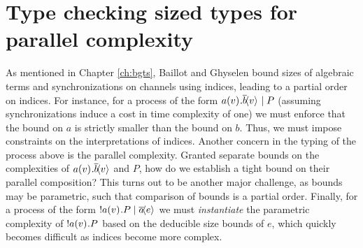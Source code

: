 \chapter{Type checking sized types for parallel complexity}\label{ch:typecheck}
As mentioned in Chapter \ref{ch:bgts}, Baillot and Ghyselen \cite{BaillotGhyselen2021} bound sizes of algebraic terms and synchronizations on channels using indices, leading to a partial order on indices. For instance, for a process of the form $a(v)^{}.\overline{b}\!\langle v\rangle^{} \mid P$ (assuming synchronizations induce a cost in time complexity of one) we must enforce that the bound on $a$ is strictly smaller than the bound on $b$. Thus, we must impose constraints on the interpretations of indices. Another concern in the typing of the process above is the parallel complexity. Granted separate bounds on the complexities of $a(v)^{}.\overline{b}\!\langle v\rangle^{}$ and $P$, how do we establish a tight bound on their parallel composition? This turns out to be another major challenge, as bounds may be parametric, such that comparison of bounds is a partial order. Finally, for a process of the form $!a(v)^{}.P \mid \overline{a}\!\langle e\rangle^{}$ we must \textit{instantiate} the parametric complexity of $!a(v)^{}.P$ based on the deducible size bounds of $e$, which quickly becomes difficult as indices become more complex.\\ %
%
%

